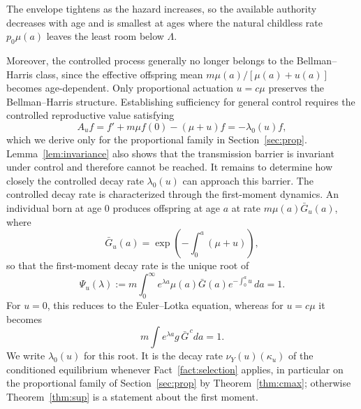 \documentclass[letterpaper, 10pt, conference]{ieeeconf}
\newcommand{\Lbar}{\Lambda}
\newcommand{\rev}[1]{#1}
\begin{document}
\rev{The envelope tightens as the hazard increases, so the available authority
decreases with age and is smallest at ages where the natural childless rate
$p_0\mu(a)$ leaves the least room below $\Lbar$.}

Moreover, the controlled process generally no longer belongs to the Bellman--Harris class, since the effective offspring mean $m\mu(a)/[\mu(a)+u(a)]$ becomes age-dependent. Only proportional actuation $u=c\mu$ preserves the Bellman--Harris structure. Establishing sufficiency for general control requires the controlled reproductive value satisfying
\begin{equation}
A_uf=f'+m\mu f(0)-(\mu+u)f=-\lambda_0(u)f,
\label{eq:agecancel}
\end{equation}
which we derive only for the proportional family in
Section~\ref{sec:prop}.
Lemma~\ref{lem:invariance} also shows that the transmission barrier is invariant
under control and therefore cannot be reached. It remains to determine how
closely the controlled decay rate $\lambda_0(u)$ can approach this barrier.
The controlled decay rate is characterized through the first-moment dynamics.
An individual born at age $0$ produces offspring at age $a$ at rate
$m\mu(a)\bar G_u(a)$, where
\[
\bar G_u(a)=\exp\!\left(-\int_0^a(\mu+u)\right),
\]
so that the first-moment decay rate is the unique root of
\begin{equation}
\Psi_u(\lambda)
:=
m\int_0^\infty
e^{\lambda a}\mu(a)\bar G(a)e^{-\int_0^au}\,da
=1.
\label{eq:ELu}
\end{equation}
For $u=0$, this reduces to the Euler--Lotka equation, whereas for
$u=c\mu$ it becomes
\[
m\int e^{\lambda a}g\,\bar G^{\,c}da=1.
\]
\rev{We write $\lambda_0(u)$ for this root. It is the decay rate
$\nu_Y(u)(\kappa_u)$ of the conditioned equilibrium whenever
Fact~\ref{fact:selection} applies, in particular on the proportional family of
Section~\ref{sec:prop} by Theorem~\ref{thm:cmax}; otherwise
Theorem~\ref{thm:sup} is a statement about the first moment.}
\end{document}
